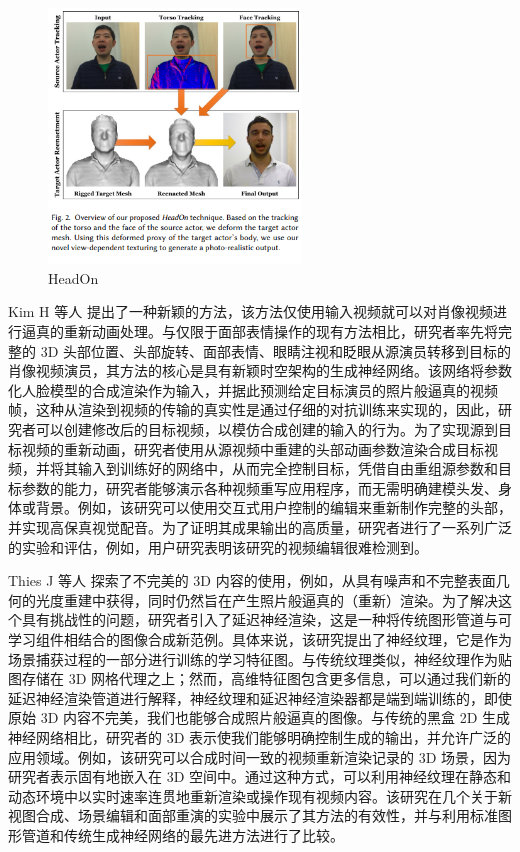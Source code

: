 \begin{figure}[htb]
\centering 
\includegraphics[width=0.60\textwidth]{img/ch1m10.png} 
\caption{HeadOn}
\label{Test}
\end{figure}

Kim H 等人 \cite{kim2018deep} 提出了一种新颖的方法，该方法仅使用输入视频就可以对肖像视频进行逼真的重新动画处理。与仅限于面部表情操作的现有方法相比，研究者率先将完整的 3D 头部位置、头部旋转、面部表情、眼睛注视和眨眼从源演员转移到目标的肖像视频演员，其方法的核心是具有新颖时空架构的生成神经网络。该网络将参数化人脸模型的合成渲染作为输入，并据此预测给定目标演员的照片般逼真的视频帧，这种从渲染到视频的传输的真实性是通过仔细的对抗训练来实现的，因此，研究者可以创建修改后的目标视频，以模仿合成创建的输入的行为。为了实现源到目标视频的重新动画，研究者使用从源视频中重建的头部动画参数渲染合成目标视频，并将其输入到训练好的网络中，从而完全控制目标，凭借自由重组源参数和目标参数的能力，研究者能够演示各种视频重写应用程序，而无需明确建模头发、身体或背景。例如，该研究可以使用交互式用户控制的编辑来重新制作完整的头部，并实现高保真视觉配音。为了证明其成果输出的高质量，研究者进行了一系列广泛的实验和评估，例如，用户研究表明该研究的视频编辑很难检测到。

Thies J 等人 \cite{thies2019deferred}探索了不完美的 3D 内容的使用，例如，从具有噪声和不完整表面几何的光度重建中获得，同时仍然旨在产生照片般逼真的（重新）渲染。为了解决这个具有挑战性的问题，研究者引入了延迟神经渲染，这是一种将传统图形管道与可学习组件相结合的图像合成新范例。具体来说，该研究提出了神经纹理，它是作为场景捕获过程的一部分进行训练的学习特征图。与传统纹理类似，神经纹理作为贴图存储在 3D 网格代理之上；然而，高维特征图包含更多信息，可以通过我们新的延迟神经渲染管道进行解释，神经纹理和延迟神经渲染器都是端到端训练的，即使原始 3D 内容不完美，我们也能够合成照片般逼真的图像。与传统的黑盒 2D 生成神经网络相比，研究者的 3D 表示使我们能够明确控制生成的输出，并允许广泛的应用领域。例如，该研究可以合成时间一致的视频重新渲染记录的 3D 场景，因为研究者表示固有地嵌入在 3D 空间中。通过这种方式，可以利用神经纹理在静态和动态环境中以实时速率连贯地重新渲染或操作现有视频内容。该研究在几个关于新视图合成、场景编辑和面部重演的实验中展示了其方法的有效性，并与利用标准图形管道和传统生成神经网络的最先进方法进行了比较。

